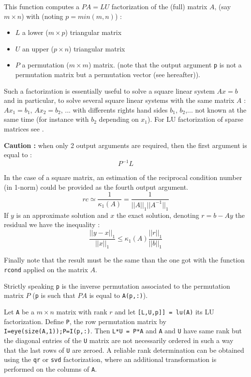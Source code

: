 \begin{mandescription}
This function computes a $P A = L U$ factorization of the (full) matrix $A$, 
(say $m \times n$) with (noting $p = min(m,n)$) :
\begin{itemize}
\item $L$ a lower  ($m \times p$) triangular matrix
\item $U$ an upper  ($p \times n$) triangular matrix
\item $P$ a permutation  ($m \times m$) matrix.
      (note that the output argument \verb+p+ is not a permutation matrix
       but a permutation vector (see hereafter)). 
\end{itemize}
Such a factorization is essentially useful to solve a square linear
system $A x = b$ and in particular, to solve several square linear
systems with the same matrix $A$ : $Ax_1=b_1$, $Ax_2 = b_2$, ... with
differents rights hand sides $b_1$, $b_2$,... not known at the same
time (for instance with $b_2$ depending on $x_1$). For LU factorization
of sparse matrices see .

{\bf Caution :} when only 2 output arguments are required, then the first argument is
equal to :
$$
P^{-1}L
$$



In the case of a square matrix, an estimation of the reciprocal
condition number (in 1-norm) could be provided as the fourth output argument.
$$
rc \simeq \frac{1}{\kappa_1(A)} = \frac{1}{||A||_1 ||A^{-1}||_1}
$$
If $y$ is an approximate solution and $x$ the exact solution,
denoting $r = b - A y$ the residual we have the inequality :
$$
\frac{|| y - x||_1}{||x||_1} \le \kappa_1(A) \frac{||r||_1}{||b||_1}
$$
 
Finally note that the result must be the same than the one got 
with the function \verb+rcond+ applied on the matrix $A$.
 
Strictly speaking \verb+p+ is the inverse permutation associated
to the permutation matrix $P$ (\verb+p+ is such that $PA$ is equal 
to \verb+A(p,:)+).

Let \verb!A! be a $m \times n$ matrix with rank $r$ and let \verb![L,U,p]] = lu(A)! its LU factorization. 
Define \verb!P!, the row permutation matrix by \verb!I=eye(size(A,1));P=I(p,:)!. Then \verb!L*U = P*A! and 
\verb!A! and \verb!U! have same rank but the diagonal entries of the \verb!U! matrix are not necessarily 
ordered in such a way that the last rows of \verb!U! are zeroed.
A reliable rank determination can be obtained using the \verb!qr! or \verb!svd! factorization, 
where an additional transformation is performed on the columns of \verb!A!.
\end{mandescription}

